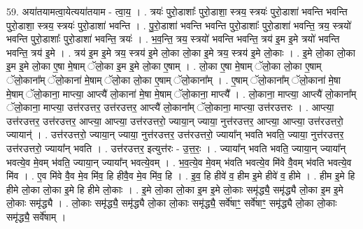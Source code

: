 \documentclass[17pt]{extarticle}
\begin{document}
59. अया॑तयामत्वा॒येत्यया॑तयाम - त्वा॒य॒ । . त्रयः॑ पुरो॒डाशाः᳚ पुरो॒डाशा॒ स्त्रय॒ स्त्रयः॑ पुरो॒डाशा॑ भवन्ति भवन्ति पुरो॒डाशा॒ स्त्रय॒ स्त्रयः॑ पुरो॒डाशा॑ भवन्ति । . पु॒रो॒डाशा॑ भवन्ति भवन्ति पुरो॒डाशाः᳚ पुरो॒डाशा॑ भवन्ति॒ त्रय॒ स्त्रयो॑ भवन्ति पुरो॒डाशाः᳚ पुरो॒डाशा॑ भवन्ति॒ त्रयः॑ । . भ॒व॒न्ति॒ त्रय॒ स्त्रयो॑ भवन्ति भवन्ति॒ त्रय॑ इ॒म इ॒मे त्रयो॑ भवन्ति भवन्ति॒ त्रय॑ इ॒मे । . त्रय॑ इ॒म इ॒मे त्रय॒ स्त्रय॑ इ॒मे लो॒का लो॒का इ॒मे त्रय॒ स्त्रय॑ इ॒मे लो॒काः । . इ॒मे लो॒का लो॒का इ॒म इ॒मे लो॒का ए॒षा मे॒षाम् ॅलो॒का इ॒म इ॒मे लो॒का ए॒षाम् । . लो॒का ए॒षा मे॒षाम् ॅलो॒का लो॒का ए॒षाम् ॅलो॒काना᳚म् ॅलो॒काना॑ मे॒षाम् ॅलो॒का लो॒का ए॒षाम् ॅलो॒काना᳚म् । . ए॒षाम् ॅलो॒काना᳚म् ॅलो॒काना॑ मे॒षा मे॒षाम् ॅलो॒काना॒ माप्त्या॒ आप्त्यै॑ लो॒काना॑ मे॒षा मे॒षाम् ॅलो॒काना॒ माप्त्यै᳚ । . लो॒काना॒ माप्त्या॒ आप्त्यै॑ लो॒काना᳚म् ॅलो॒काना॒ माप्त्या॒ उत्त॑र‌उत्तर॒ उत्त॑र‌उत्तर॒ आप्त्यै॑ लो॒काना᳚म् ॅलो॒काना॒ माप्त्या॒ उत्त॑र‌उत्तरः । . आप्त्या॒ उत्त॑र‌उत्तर॒ उत्त॑र‌उत्तर॒ आप्त्या॒ आप्त्या॒ उत्त॑र‌उत्तरो॒ ज्याया॒न् ज्याया॒ नुत्त॑र‌उत्तर॒ आप्त्या॒ आप्त्या॒ उत्त॑र‌उत्तरो॒ ज्यायान्॑ । . उत्त॑र‌उत्तरो॒ ज्याया॒न् ज्याया॒ नुत्त॑र‌उत्तर॒ उत्त॑र‌उत्तरो॒ ज्याया᳚न् भवति भवति॒ ज्याया॒ नुत्त॑र‌उत्तर॒ उत्त॑र‌उत्तरो॒ ज्याया᳚न् भवति । . उत्त॑र‌उत्तर॒ इत्युत्त॑रः - उ॒त्त॒रः॒ । . ज्याया᳚न् भवति भवति॒ ज्याया॒न् ज्याया᳚न् भवत्ये॒व मे॒वम् भ॑वति॒ ज्याया॒न् ज्याया᳚न् भवत्ये॒वम् । . भ॒व॒त्ये॒व मे॒वम् भ॑वति भवत्ये॒व मि॑वे वै॒वम् भ॑वति भवत्ये॒व मि॑व । . ए॒व मि॑वे वै॒व मे॒व मि॑व॒ हि हीवै॒व मे॒व मि॑व॒ हि । . इ॒व॒ हि हीवे॑ व॒ हीम इ॒मे हीवे॑ व॒ हीमे । . हीम इ॒मे हि हीमे लो॒का लो॒का इ॒मे हि हीमे लो॒काः । . इ॒मे लो॒का लो॒का इ॒म इ॒मे लो॒काः समृ॑द्ध्यै॒ समृ॑द्ध्यै लो॒का इ॒म इ॒मे लो॒काः समृ॑द्ध्यै । . लो॒काः समृ॑द्ध्यै॒ समृ॑द्ध्यै लो॒का लो॒काः समृ॑द्ध्यै॒ सर्वे॑षाꣳ॒॒ सर्वे॑षाꣳ॒॒ समृ॑द्ध्यै लो॒का लो॒काः समृ॑द्ध्यै॒ सर्वे॑षाम् । \newline
\end{document}

